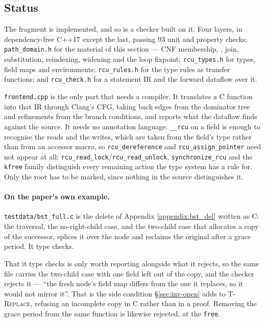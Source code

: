 \subsection{Status}
\label{sec:pathfrag-eval}

The fragment is implemented, and so is a checker built on it.  Four layers, in
dependency-free C++17 except the last, passing 93 unit and property checks:
\texttt{path\_domain.h} for the material of this section --- CNF membership,
\MayAlias{}, join, substitution, reindexing, widening and the loop fixpoint;
\texttt{rcu\_types.h} for types, field maps and environments;
\texttt{rcu\_rules.h} for the type rules as transfer functions; and
\texttt{rcu\_check.h} for a statement IR and the forward dataflow over it.

\texttt{frontend.cpp} is the only part that needs a compiler.  It translates a C
function into that IR through Clang's CFG, taking back edges from the dominator
tree and refinements from the branch conditions, and reports what the dataflow
finds against the source.  It needs no annotation language: \texttt{\_\_rcu} on
a field is enough to recognise the reads and the writes, which are taken from
the field's type rather than from an accessor macro, so
\texttt{rcu\_dereference} and \texttt{rcu\_assign\_pointer} need not appear at
all; \texttt{rcu\_read\_lock}/\texttt{rcu\_read\_unlock},
\texttt{synchronize\_rcu} and the \texttt{kfree} family distinguish every
remaining action the type system has a rule for.  Only the root has to be
marked, since nothing in the source distinguishes it.

\paragraph{On the paper's own example.}  \texttt{testdata/bst\_full.c} is the
delete of Appendix \ref{appendix:bst_del} written as C: the traversal, the
no-right-child case, and the two-child case that allocates a copy of the
successor, splices it over the node and reclaims the original after a grace
period.  It type checks.

That it type checks is only worth reporting alongside what it rejects, so the
same file carries the two-child case with one field left out of the copy, and
the checker rejects it --- ``the fresh node's field map differs from the one it
replaces, so it would not mirror it''.  That is the side condition
\S\ref{sec:inv-open} adds to \textsc{T-Replace}, refusing an incomplete copy in
C rather than in a proof.  Removing the grace period from the same function is
likewise rejected, at the \texttt{free}.

